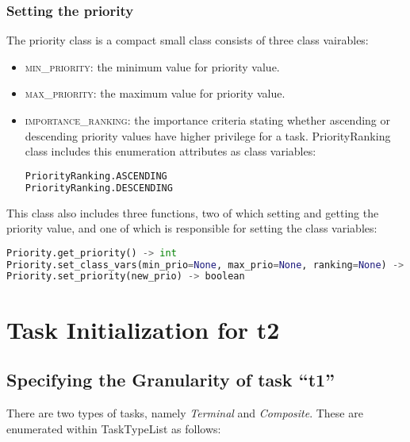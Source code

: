 \documentclass[]{scrartcl}
\begin{document}
        
\subsubsection{Setting the priority}
The priority class is a compact small class consists of three class vairables:
\begin{itemize}
    \item \textsc{min\_priority}: the minimum value for priority value.
    \item \textsc{max\_priority}: the maximum value for priority value.
    \item \textsc{importance\_ranking}: the importance criteria stating whether ascending or descending priority values have higher privilege for a task. \textsf{PriorityRanking} class includes this enumeration attributes
    as class variables:
    
\begin{lstlisting}[language=Python, frame=single, label={lst:t1PriorityRanking}, caption={The \textsf{PriorityRanking} enumeration.}]
PriorityRanking.ASCENDING
PriorityRanking.DESCENDING
\end{lstlisting}
        
\end{itemize}
        
This class also includes three functions, two of which setting and getting the priority value, and one of which is responsible for setting the class variables:

\begin{lstlisting}[language=Python, frame=single, label={lst:t1memberFunctionsPriority}, caption={The member functions for \textsf{Priority} module.}]
Priority.get_priority() -> int
Priority.set_class_vars(min_prio=None, max_prio=None, ranking=None) -> None (class method)
Priority.set_priority(new_prio) -> boolean
\end{lstlisting}
        
        
\section{Task Initialization for \textsf{t2}}
        
\subsection{Specifying the Granularity of task ``t1''}
There are two types of tasks, namely \emph{Terminal} and \emph{Composite}. These are enumerated within \textsf{TaskTypeList} as follows:
\end{document}
